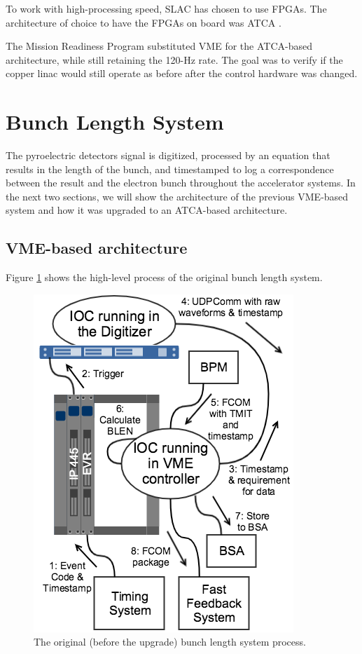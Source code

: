 \documentclass[letter,
        biblatex,   %
        keeplastbox,  %
        ]{jacow}
\begin{document}
To work with high-processing speed, SLAC has chosen to use FPGAs. The architecture of choice to have the FPGAs on board was ATCA \cite{ryan-2016, vme-replacement-2012}.

The Mission Readiness Program substituted VME for the ATCA-based architecture, while still retaining the 120-Hz rate. The goal was to verify if the copper linac would still operate as before after the control hardware was changed.

\section{Bunch Length System}
The pyroelectric detectors signal is digitized, processed by an equation that results in the length of the bunch, and timestamped to log a correspondence between the result and the electron bunch throughout the accelerator systems. In the next two sections, we will show the architecture of the previous VME-based system and how it was upgraded to an ATCA-based architecture.

\subsection{VME-based architecture}
Figure \ref{fig:blen_vme} shows the high-level process of the original bunch length system.

\begin{figure}[!htb]
  \centering
  \includegraphics*[width=.8\columnwidth]{BLEN_VME_Process}
  \caption{The original (before the upgrade) bunch length system process.}
  \label{fig:blen_vme}
\end{figure}
\end{document}
